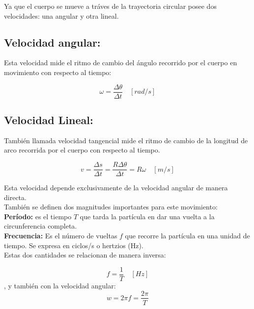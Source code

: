 \documentclass[a5paper,pagesize,10pt,bibtotoc,pointlessnumbers,
normalheadings,DIV=9,fleqn,x11names,table,twoside=false]{scrbook}
\begin{document}
Ya que el cuerpo se mueve a tráves de la trayectoria circular posee dos velocidades: una angular y otra lineal.\\

\subsection{Velocidad angular:}

Esta velocidad mide el ritmo de cambio del ángulo recorrido por el cuerpo en movimiento con respecto al tiempo:

\begin{equation}
\omega = \frac{\Delta \theta}{\Delta t} \quad [rad/s]
\end{equation}

\subsection{Velocidad Lineal:}

También llamada velocidad tangencial mide el ritmo de cambio de la longitud de arco recorrida por el cuerpo con respecto al 
tiempo.

\begin{equation}
v = \frac{\Delta s}{\Delta t} = \frac{R\Delta \theta}{\Delta t} = R\omega \quad [m/s]
\end{equation}

Esta velocidad depende exclusivamente de la velocidad angular de manera directa.\\

También se definen dos magnitudes importantes para este movimiento:\\

\textbf{Período:} es el tiempo $T$ que tarda la partícula en dar una vuelta a la circunferencia completa.\\

\textbf{Frecuencia:} Es el número de vueltas $f$ que recorre la partícula en una unidad de tiempo. Se expresa en ciclos/s o 
hertzios (Hz).\\

Estas dos cantidades se relacionan de manera inversa:

\begin{equation}
f = \frac{1}{T}\quad [Hz]
\end{equation}
, y también con la velocidad angular: 
\begin{equation}
w = 2\pi f = \frac{2\pi}{T}
\end{equation}
\end{document}
